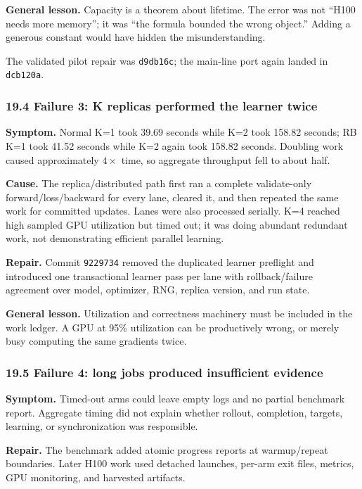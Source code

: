 \documentclass[
  10pt,
  letterpaper,
]{article}
\begin{document}
\textbf{General lesson.} Capacity is a theorem about lifetime. The error
was not ``H100 needs more memory''; it was ``the formula bounded the
wrong object.'' Adding a generous constant would have hidden the
misunderstanding.

The validated pilot repair was \texttt{d9db16c}; the main-line port
again landed in \texttt{dcb120a}.

\subsubsection{19.4 Failure 3: K replicas performed the learner
twice}\label{194-failure-3-k-replicas-performed-the-learner-twice}

\textbf{Symptom.} Normal K=1 took 39.69 seconds while K=2 took 158.82
seconds; RB K=1 took 41.52 seconds while K=2 again took 158.82 seconds.
Doubling work caused approximately \(4\times\) time, so aggregate
throughput fell to about half.

\textbf{Cause.} The replica/distributed path first ran a complete
validate-only forward/loss/backward for every lane, cleared it, and then
repeated the same work for committed updates. Lanes were also processed
serially. K=4 reached high sampled GPU utilization but timed out; it was
doing abundant redundant work, not demonstrating efficient parallel
learning.

\textbf{Repair.} Commit \texttt{9229734} removed the duplicated learner
preflight and introduced one transactional learner pass per lane with
rollback/failure agreement over model, optimizer, RNG, replica version,
and run state.

\textbf{General lesson.} Utilization and correctness machinery must be
included in the work ledger. A GPU at 95\% utilization can be
productively wrong, or merely busy computing the same gradients twice.

\subsubsection{19.5 Failure 4: long jobs produced insufficient
evidence}\label{195-failure-4-long-jobs-produced-insufficient-evidence}

\textbf{Symptom.} Timed-out arms could leave empty logs and no partial
benchmark report. Aggregate timing did not explain whether rollout,
completion, targets, learning, or synchronization was responsible.

\textbf{Repair.} The benchmark added atomic progress reports at
warmup/repeat boundaries. Later H100 work used detached launches,
per-arm exit files, metrics, GPU monitoring, and harvested artifacts.
\end{document}
